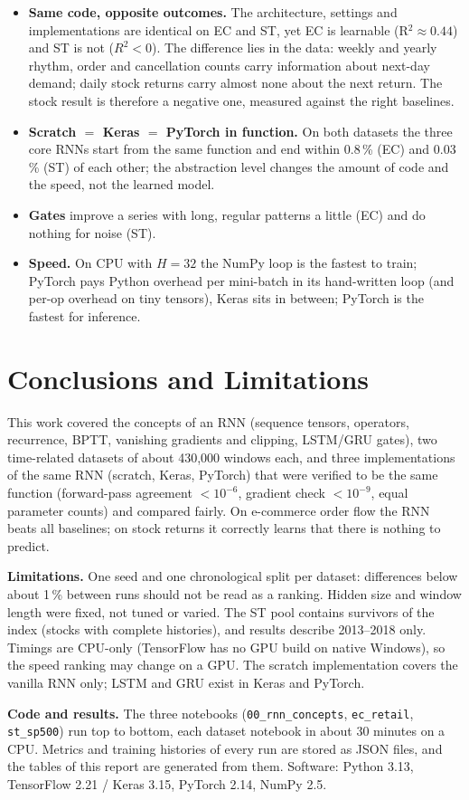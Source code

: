 \documentclass[11pt, a4paper]{article}
\begin{document}
\begin{itemize}
\item \textbf{Same code, opposite outcomes.} The architecture, settings and implementations are identical on EC and ST, yet EC is learnable (R$^2\approx0.44$) and ST is not ($R^2<0$).
  The difference lies in the data: weekly and yearly rhythm, order and cancellation counts carry information about next-day demand; daily stock returns carry almost none about the next return.
  The stock result is therefore a negative one, measured against the right baselines.
\item \textbf{Scratch $=$ Keras $=$ PyTorch in function.} On both datasets the three core RNNs start from the same function and end within 0.8\,\% (EC) and 0.03\,\% (ST) of each other; the abstraction level changes the amount of code and the speed, not the learned model.
\item \textbf{Gates} improve a series with long, regular patterns a little (EC) and do nothing for noise (ST).
\item \textbf{Speed.} On CPU with $H=32$ the NumPy loop is the fastest to train; PyTorch pays Python overhead per mini-batch in its hand-written loop (and per-op overhead on tiny tensors), Keras sits in between; PyTorch is the fastest for inference.
\end{itemize}

\section{Conclusions and Limitations}

This work covered the concepts of an RNN (sequence tensors, operators, recurrence, BPTT, vanishing gradients and clipping, LSTM/GRU gates), two
time-related datasets of about 430{,}000 windows each, and three implementations of the same RNN (scratch, Keras, PyTorch) that were verified to be the same function
(forward-pass agreement $<10^{-6}$, gradient check $<10^{-9}$, equal parameter counts) and compared fairly. On e-commerce order flow the RNN beats all baselines; on stock returns it
correctly learns that there is nothing to predict.

\textbf{Limitations.} One seed and one chronological split per dataset: differences below about 1\,\% between runs should not be read as a ranking. Hidden size and window length were fixed, not tuned or varied. The ST pool contains survivors of the index (stocks with complete histories), and results describe 2013--2018 only. Timings are CPU-only (TensorFlow has no GPU build on native Windows),
so the speed ranking may change on a GPU. The scratch implementation covers the vanilla RNN only; LSTM and GRU exist in Keras and PyTorch.

\textbf{Code and results.} The three notebooks (\texttt{00\_rnn\_concepts}, \texttt{ec\_retail}, \texttt{st\_sp500}) run top to bottom, each dataset notebook in about 30 minutes on a CPU.
Metrics and training histories of every run are stored as JSON files, and the tables of this report are generated from them. Software: Python 3.13, TensorFlow 2.21 / Keras 3.15, PyTorch 2.14, NumPy 2.5.
\end{document}
